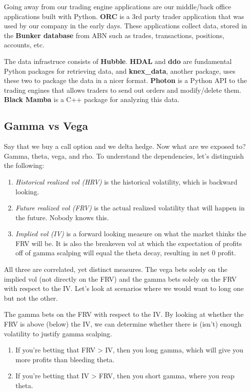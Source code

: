 \documentclass{article}
\begin{document}
    Going away from our trading engine applications are our middle/back office applications built with Python. \textbf{ORC} is a 3rd party trader application that was used by our company in the early days. These applications collect data, stored in the \textbf{Bunker database} from ABN such as trades, transactions, positions, accounts, etc.

    The data infrastruce consists of \textbf{Hubble}. \textbf{HDAL} and \textbf{ddo} are fundamental Python packages for retrieving data, and \textbf{knex\_data}, another package, uses these two to package the data in a nicer format. \textbf{Photon} is a Python API to the trading engines that allows traders to send out orders and modify/delete them. \textbf{Black Mamba} is a C++ package for analyzing this data.

  \subsection{Gamma vs Vega}

    Say that we buy a call option and we delta hedge. Now what are we exposed to? Gamma, theta, vega, and rho. To understand the dependencies, let's distinguish the following:
    \begin{enumerate}
      \item \textit{Historical realized vol (HRV)} is the historical volatility, which is backward looking.
      \item \textit{Future realized vol (FRV)} is the actual realized volatility that will happen in the future. Nobody knows this.
      \item \textit{Implied vol (IV)} is a forward looking measure on what the market thinks the FRV will be. It is also the breakeven vol at which the expectation of profits off of gamma scalping will equal the theta decay, resulting in net $0$ profit.
    \end{enumerate}
    All three are correlated, yet distinct measures. The vega bets solely on the implied vol (not directly on the FRV) and the gamma bets solely on the FRV with respect to the IV. Let's look at scenarios where we would want to long one but not the other.

    \begin{example}
      The gamma bets on the FRV with respect to the IV. By looking at whether the FRV is above (below) the IV, we can determine whether there is (isn't) enough volatility to justify gamma scalping.
      \begin{enumerate}
        \item If you're betting that FRV > IV, then you long gamma, which will give you more profits than bleeding theta.
        \item If you're betting that IV > FRV, then you short gamma, where you reap theta.
      \end{enumerate}
    \end{example}
\end{document}
